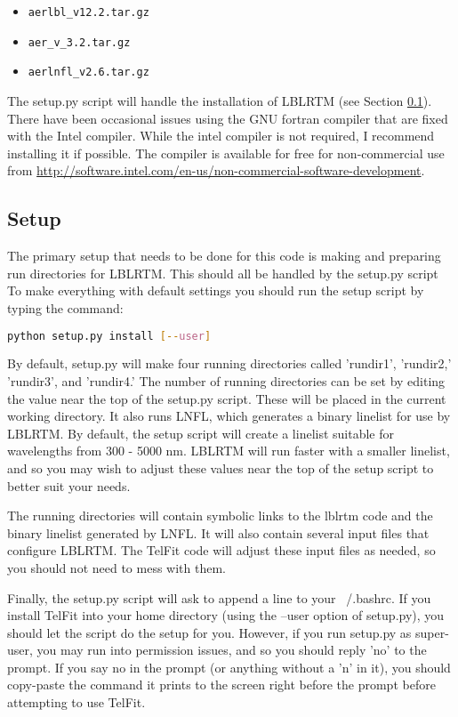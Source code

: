 \documentclass{article}
\begin{document}
\begin{itemize}
\item \verb|aerlbl_v12.2.tar.gz|
\item \verb|aer_v_3.2.tar.gz|
\item \verb|aerlnfl_v2.6.tar.gz|
\end{itemize}

The setup.py script will handle the installation of LBLRTM (see Section \ref{sec:setup}). There have been occasional issues using the GNU fortran compiler that are fixed with the Intel compiler. While the intel compiler is not required, I recommend installing it if possible. The compiler is available for free for non-commercial use from \url{http://software.intel.com/en-us/non-commercial-software-development}.



\subsection{Setup}
\label{sec:setup}

The primary setup that needs to be done for this code is making and preparing run directories for LBLRTM. This should all be handled by the setup.py script To make everything with default settings you should run the setup script by typing the command:
\begin{lstlisting}[language=bash]
   python setup.py install [--user]
\end{lstlisting}

By default, setup.py will make four running directories called 'rundir1', 'rundir2,' 'rundir3', and 'rundir4.' The number of running directories can be set by editing the value near the top of the setup.py script. These will be placed in the current working directory.  It also runs LNFL, which generates a binary linelist for use by LBLRTM. By default, the setup script will create a linelist suitable for wavelengths from 300 - 5000 nm. LBLRTM will run faster with a smaller linelist, and so you may wish to adjust these values near the top of the setup script to better suit your needs.

The running directories will contain symbolic links to the lblrtm code and the binary linelist generated by LNFL. It will also contain several input files that configure LBLRTM. The TelFit code will adjust these input files as needed, so you should not need to mess with them.

Finally, the setup.py script will ask to append a line to your ~/.bashrc. If you install TelFit into your home directory (using the --user option of setup.py), you should let the script do the setup for you. However, if you run setup.py as super-user, you may run into permission issues, and so you should reply 'no' to the prompt. If you say no in the prompt (or anything without a 'n' in it), you should copy-paste the command it prints to the screen right before the prompt before attempting to use TelFit. 
\end{document}
